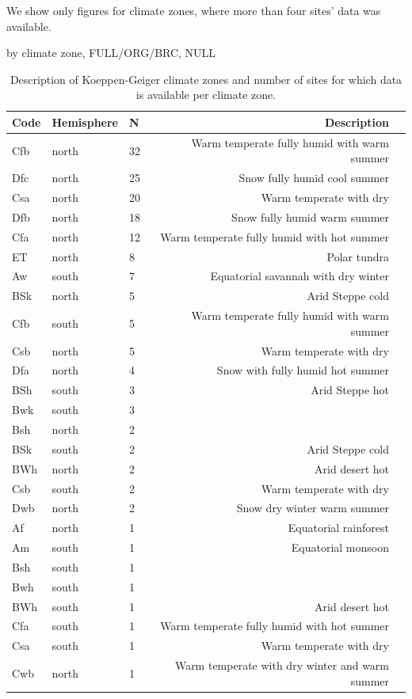 \documentclass{myreport}
\begin{document}
 We show only figures for climate zones, where more than four sites' data was available.
 
 by climate zone, FULL/ORG/BRC, NULL
 
\begin{table}
\caption{Description of Koeppen-Geiger climate zones and number of sites for which data is available per climate zone.} 
\centering
\begin{tabular}{lllrl}
  \toprule
  Code & Hemisphere & N & Description \\ 
  \midrule
   Cfb & north & 32 & Warm temperate fully humid with warm summer \\ 
   Dfc & north & 25 & Snow fully humid cool summer \\ 
   Csa & north & 20 & Warm temperate with dry \\ 
   Dfb & north & 18 & Snow fully humid warm summer \\ 
   Cfa & north & 12 & Warm temperate fully humid with hot summer \\ 
   ET & north & 8 & Polar tundra \\ 
   Aw & south & 7 & Equatorial savannah with dry winter \\ 
   BSk & north & 5 & Arid Steppe cold \\ 
   Cfb & south & 5 & Warm temperate fully humid with warm summer \\ 
   Csb & north & 5 & Warm temperate with dry \\ 
  \midrule
   Dfa & north & 4 & Snow with fully humid hot summer \\ 
   BSh & south & 3 & Arid Steppe hot \\ 
   Bwk & south & 3 &  \\ 
   Bsh & north & 2 &  \\ 
   BSk & south & 2 & Arid Steppe cold \\ 
   BWh & north & 2 & Arid desert hot \\ 
   Csb & south & 2 & Warm temperate with dry \\ 
   Dwb & north & 2 & Snow dry winter warm summer \\ 
   Af & north & 1 & Equatorial rainforest \\ 
   Am & south & 1 & Equatorial monsoon \\ 
   Bsh & south & 1 &  \\ 
   Bwh & south & 1 &  \\ 
   BWh & south & 1 & Arid desert hot \\ 
   Cfa & south & 1 & Warm temperate fully humid with hot summer \\ 
   Csa & south & 1 & Warm temperate with dry \\ 
   Cwb & north & 1 & Warm temperate with dry winter and warm summer \\ 
   \bottomrule
  \end{tabular}
  \label{tab:kgclimate}
\end{table}
\end{document}
